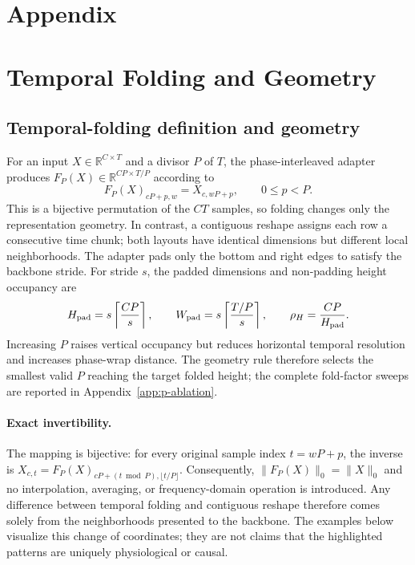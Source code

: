 \section*{Appendix}

\section{Temporal Folding and Geometry}
\label{app:folding}

\subsection{Temporal-folding definition and geometry}
\label{app:folding-definition}

For an input $X\in\mathbb{R}^{C\times T}$ and a divisor $P$ of $T$, the
phase-interleaved adapter produces $F_P(X)\in\mathbb{R}^{CP\times T/P}$
according to
\[
F_P(X)_{cP+p,w}=X_{c,wP+p},\qquad 0\le p<P.
\]
This is a bijective permutation of the $CT$ samples, so folding changes only
the representation geometry. In contrast, a contiguous reshape assigns each
row a consecutive time chunk; both layouts have identical dimensions but
different local neighborhoods. The adapter pads only the bottom and right
edges to satisfy the backbone stride. For stride $s$, the padded dimensions
and non-padding height occupancy are
\[
H_{\rm pad}=s\left\lceil\frac{CP}{s}\right\rceil,\qquad
W_{\rm pad}=s\left\lceil\frac{T/P}{s}\right\rceil,\qquad
\rho_H=\frac{CP}{H_{\rm pad}}.
\]
Increasing $P$ raises vertical occupancy but reduces horizontal temporal
resolution and increases phase-wrap distance. The geometry rule therefore
selects the smallest valid $P$ reaching the target folded height; the complete
fold-factor sweeps are reported in Appendix~\ref{app:p-ablation}.

\paragraph{Exact invertibility.}
The mapping is bijective: for every original sample index
$t=wP+p$, the inverse is
$X_{c,t}=F_P(X)_{cP+(t\bmod P),\lfloor t/P\rfloor}$. Consequently,
$\|F_P(X)\|_0=\|X\|_0$ and no interpolation, averaging, or frequency-domain
operation is introduced. Any difference between temporal folding and contiguous
reshape therefore comes solely from the neighborhoods presented to the
backbone. The examples below visualize this change of coordinates; they are
not claims that the highlighted patterns are uniquely physiological or
causal.

